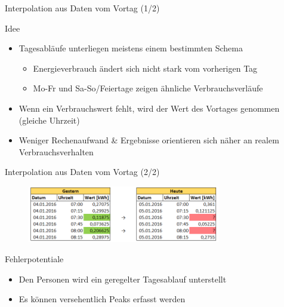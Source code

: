 \begin{frame}{Interpolation aus Daten vom Vortag (1/2)}
\begin{block}{Idee}
\begin{itemize}
\item Tagesabläufe unterliegen meistens einem bestimmten Schema
\begin{itemize}
\item Energieverbrauch ändert sich nicht stark vom vorherigen Tag
\item Mo-Fr und Sa-So/Feiertage zeigen ähnliche Verbrauchsverläufe
\end{itemize}
\item Wenn ein Verbrauchswert fehlt, wird der Wert des Vortages genommen (gleiche Uhrzeit)
\item Weniger Rechenaufwand \& Ergebnisse orientieren sich näher an realem Verbrauchsverhalten
\end{itemize}
\end{block}
\end{frame}

\begin{frame}{Interpolation aus Daten vom Vortag (2/2)}
\begin{figure}
  \centering
     \includegraphics[width=0.75\textwidth]{pics/yesterday2.png}
  \label{fig:Bild1}
\end{figure}
\begin{block}{Fehlerpotentiale}
\begin{itemize}
\item Den Personen wird ein geregelter Tagesablauf unterstellt
\item Es können versehentlich Peaks erfasst werden
\end{itemize}
\end{block}
\end{frame}

